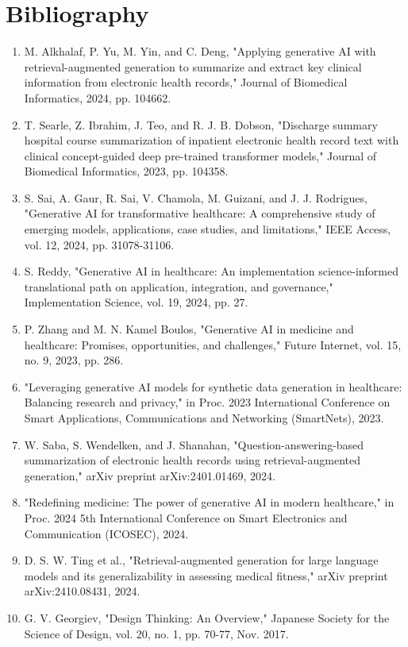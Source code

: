 \chapter*{Bibliography}
\begin{enumerate}
    \item M. Alkhalaf, P. Yu, M. Yin, and C. Deng, "Applying generative AI with retrieval-augmented generation to summarize and extract key clinical information from electronic health records," Journal of Biomedical Informatics, 2024, pp. 104662.

    \item T. Searle, Z. Ibrahim, J. Teo, and R. J. B. Dobson, "Discharge summary hospital course summarization of inpatient electronic health record text with clinical concept-guided deep pre-trained transformer models," Journal of Biomedical Informatics, 2023, pp. 104358.

    \item S. Sai, A. Gaur, R. Sai, V. Chamola, M. Guizani, and J. J. Rodrigues, "Generative AI for transformative healthcare: A comprehensive study of emerging models, applications, case studies, and limitations," IEEE Access, vol. 12, 2024, pp. 31078-31106.

    \item S. Reddy, "Generative AI in healthcare: An implementation science-informed translational path on application, integration, and governance," Implementation Science, vol. 19, 2024, pp. 27.

    \item P. Zhang and M. N. Kamel Boulos, "Generative AI in medicine and healthcare: Promises, opportunities, and challenges," Future Internet, vol. 15, no. 9, 2023, pp. 286.

    \item "Leveraging generative AI models for synthetic data generation in healthcare: Balancing research and privacy," in Proc. 2023 International Conference on Smart Applications, Communications and Networking (SmartNets), 2023.

    \item W. Saba, S. Wendelken, and J. Shanahan, "Question-answering-based summarization of electronic health records using retrieval-augmented generation," arXiv preprint arXiv:2401.01469, 2024.

    \item "Redefining medicine: The power of generative AI in modern healthcare," in Proc. 2024 5th International Conference on Smart Electronics and Communication (ICOSEC), 2024.

    \item D. S. W. Ting et al., "Retrieval-augmented generation for large language models and its generalizability in assessing medical fitness," arXiv preprint arXiv:2410.08431, 2024.

    \item G. V. Georgiev, "Design Thinking: An Overview," Japanese Society for the Science of Design, vol. 20, no. 1, pp. 70-77, Nov. 2017.
\end{enumerate}